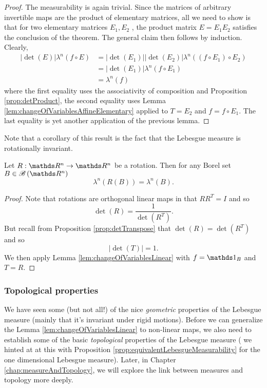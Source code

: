 \begin{proof}
The measurability is again trivial. Since the matrices of arbitrary
invertible maps are the product of elementary matrices, all we need
to show is that for two elementary matrices $E_{1},E_{2}$ , the product
matrix $E=E_{1}E_{2}$ satisfies the conclusion of the theorem. The
general claim then follows by induction. Clearly, 
\begin{align*}
\lvert\det\left(E\right)\rvert\lambda^{n}\left(f\circ E\right) & =\lvert\det\left(E_{1}\right)\rvert\lvert\det\left(E_{2}\right)\rvert\lambda^{n}\left(\left(f\circ E_{1}\right)\circ E_{2}\right)\\
 & =\lvert\det\left(E_{1}\right)\rvert\lambda^{n}\left(f\circ E_{1}\right)\\
 & =\lambda^{n}\left(f\right)
\end{align*}
where the first equality uses the associativity of composition and
Proposition \ref{prop:detProduct}, the second equality uses Lemma
\ref{lem:changeOfVariablesAffineElementary} applied to $T=E_{2}$
and $f=f\circ E_{1}$. The last equality is yet another application
of the previous lemma.
\end{proof}
Note that a corollary of this result is the fact that the Lebesgue
measure is rotationally invariant.
\begin{cor}
\label{cor:lebesgueRotationalInvariance}Let $R:\R^{n}\to\R^{n}$
be a rotation. Then for any Borel set $B\in\borel\left(\R^{n}\right)$
\[
\lambda^{n}\left(R\left(B\right)\right)=\lambda^{n}\left(B\right).
\]
\end{cor}

\begin{proof}
Note that rotations are orthogonal linear maps in that $RR^{T}=I$
and so 
\[
\det\left(R\right)=\frac{1}{\det\left(R^{T}\right)}.
\]
But recall from Proposition \ref{prop:detTranspose} that $\det\left(R\right)=\det\left(R^{T}\right)$
and so
\[
\lvert\det\left(T\right)\rvert=1.
\]
We then apply Lemma  \ref{lem:changeOfVariablesLinear} with $f=\indicate_{B}$
and $T=R$.
\end{proof}

\subsubsection{Topological properties}

We have seen some (but not all!) of the nice \emph{geometric} properties of the Lebesgue measure (mainly that it's invariant under rigid motions). Before we can generalize the Lemma \ref{lem:changeOfVariablesLinear} to non-linear maps, we also need to establish some of the basic \emph{topological} properties of the Lebesgue measure ( we hinted at at this with Proposition \ref{prop:equivalentLebesgueMeasurability} for the one dimensional Lebesgue measure). Later, in Chapter \ref{chap:measureAndTopology}, we will explore the link between measures and topology more deeply.

